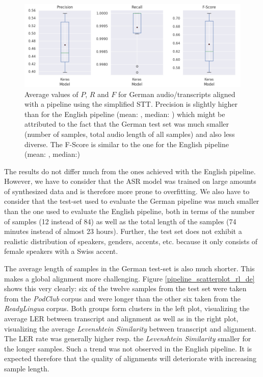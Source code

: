 \begin{figure}[h!]
	\includegraphics[width=\linewidth]{./img/boxplot_rl.png}
	\caption{Average values of $P$, $R$ and $F$ for German audio/transcripts aligned with a pipeline using the simplified \ac{STT}. Precision is slightly higher than for the English pipeline (mean: , median: ) which might be attributed to the fact that the German test set was much smaller (number of samples, total audio length of all samples) and also less diverse. The F-Score is similar to the one for the English pipeline (mean: , median:)}
	\label{pipeline_boxplot_rl_de}
\end{figure}

The results do not differ much from the ones achieved with the English pipeline. However, we have to consider that the \ac{ASR} model was trained on large amounts of synthesized data and is therefore more prone to overfitting. We also have to consider that the test-set used to evaluate the German pipeline was much smaller than the one used to evaluate the English pipeline, both in terms of the number of samples (12 instead of 84) as well as the total length of the samples (74 minutes instead of almost 23 hours). Further, the test set does not exhibit a realistic distribution of speakers, genders, accents, etc. because it only consists of female speakers with a Swiss accent. 

The average length of samples in the German test-set is also much shorter. This makes a global alignment more challenging. Figure \ref{pipeline_scatterplot_rl_de} shows this very clearly: six of the twelve samples from the test set were taken from the \textit{PodClub} corpus and were longer than the other six taken from the \textit{ReadyLingua} corpus. Both groups form clusters in the left plot, visualizing the average \ac{LER} between transcript and alignment as well as in the right plot, visualizing the average \textit{Levenshtein Similarity} between transcript and alignment. The \ac{LER} rate was generally higher resp. the \textit{Levenshtein Similarity} smaller for the longer samples. Such a trend was not observed in the English pipeline. It is expected therefore that the quality of alignments will deteriorate with increasing sample length.

